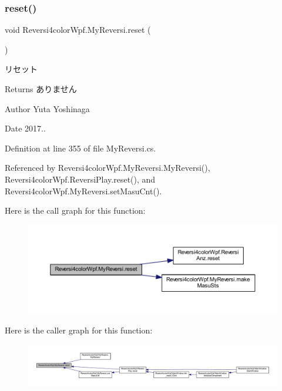 \subsubsection{\texorpdfstring{reset()}{reset()}}
{\footnotesize\ttfamily void Reversi4color\+Wpf.\+My\+Reversi.\+reset (\begin{DoxyParamCaption}{ }\end{DoxyParamCaption})}



リセット 

\begin{DoxyReturn}{Returns}
ありません 
\end{DoxyReturn}
\begin{DoxyAuthor}{Author}
Yuta Yoshinaga 
\end{DoxyAuthor}
\begin{DoxyDate}{Date}
2017.. 
\end{DoxyDate}


Definition at line 355 of file My\+Reversi.\+cs.



Referenced by Reversi4color\+Wpf.\+My\+Reversi.\+My\+Reversi(), Reversi4color\+Wpf.\+Reversi\+Play.\+reset(), and Reversi4color\+Wpf.\+My\+Reversi.\+set\+Masu\+Cnt().

Here is the call graph for this function\+:
\nopagebreak
\begin{figure}[H]
\begin{center}
\leavevmode
\includegraphics[width=350pt]{class_reversi4color_wpf_1_1_my_reversi_af80d2c161f9734e13a6b37ca0ce852dc_cgraph}
\end{center}
\end{figure}
Here is the caller graph for this function\+:
\nopagebreak
\begin{figure}[H]
\begin{center}
\leavevmode
\includegraphics[width=350pt]{class_reversi4color_wpf_1_1_my_reversi_af80d2c161f9734e13a6b37ca0ce852dc_icgraph}
\end{center}
\end{figure}
\mbox{\label{class_reversi4color_wpf_1_1_my_reversi_a6b5efd6678f80b1a5637576748457b3b}} 
